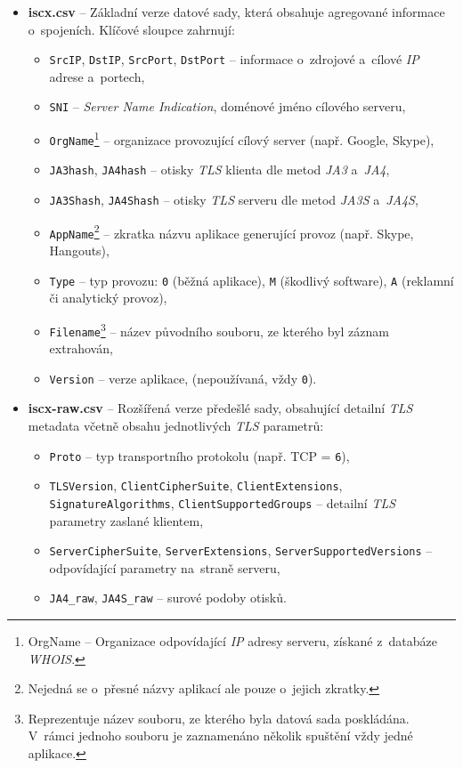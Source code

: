 \begin{itemize}
	\item \textbf{iscx.csv} -- Základní verze datové sady, která obsahuje agregované informace o~spojeních. Klíčové sloupce zahrnují:
	      \begin{itemize}
	      	\item \texttt{SrcIP}, \texttt{DstIP}, \texttt{SrcPort}, \texttt{DstPort} -- informace o~zdrojové a~cílové \textit{IP} adrese a~portech,
	      	\item \texttt{SNI} -- \textit{Server Name Indication}, doménové jméno cílového serveru,
	      	\item \texttt{OrgName}\footnote{OrgName – Organizace odpovídající \textit{IP} adresy serveru, získané z~databáze \textit{WHOIS}.} -- organizace provozující cílový server (např. Google, Skype),
	      	\item \texttt{JA3hash}, \texttt{JA4hash} -- otisky \textit{TLS} klienta dle metod \textit{JA3} a~\textit{JA4},
	      	\item \texttt{JA3Shash}, \texttt{JA4Shash} -- otisky \textit{TLS} serveru dle metod \textit{JA3S} a~\textit{JA4S},
	      	\item \texttt{AppName}\footnote{Nejedná se o~přesné názvy aplikací ale pouze o~jejich zkratky.} -- zkratka názvu aplikace generující provoz (např. Skype, Hangouts),
	      	\item \texttt{Type} -- typ provozu: \texttt{0} (běžná aplikace), \texttt{M} (škodlivý software), \texttt{A} (reklamní či analytický provoz),
	      	\item \texttt{Filename}\footnote{Reprezentuje název souboru, ze kterého byla datová sada poskládána. V~rámci jednoho souboru je zaznamenáno několik spuštění vždy jedné aplikace.} -- název původního souboru, ze kterého byl záznam extrahován,
	      	\item \texttt{Version} -- verze aplikace, (nepoužívaná, vždy \texttt{0}).
	      \end{itemize}
	      	      	      	      	      
	\item \textbf{iscx-raw.csv} -- Rozšířená verze předešlé sady, obsahující detailní \textit{TLS} metadata včetně obsahu jednotlivých \textit{TLS} parametrů:
	      \begin{itemize}
	      	\item \texttt{Proto} -- typ transportního protokolu (např. TCP = \texttt{6}),
	      	\item \texttt{TLSVersion}, \texttt{ClientCipherSuite}, \texttt{ClientExtensions}, \texttt{SignatureAlgorithms}, \texttt{ClientSupportedGroups} -- detailní \textit{TLS} parametry zaslané klientem,
	      	\item \texttt{ServerCipherSuite}, \texttt{ServerExtensions}, \texttt{ServerSupportedVersions} -- odpovídající parametry na~straně serveru,
	      	\item \texttt{JA4\_raw}, \texttt{JA4S\_raw} -- surové podoby otisků.
	      \end{itemize}
	      	      	      	      	      

\end{itemize}
